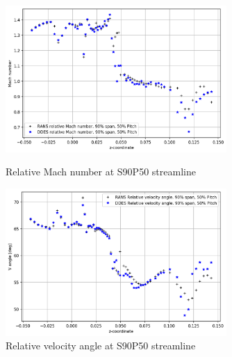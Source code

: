 \begin{figure}[ht]
  \centering
  \includegraphics[width=0.75\textwidth]{Pictures/mach-rel-S90-P50.png}
  \caption{Relative Mach number at S90P50 streamline} \label{mach-rel-S90-P50}
  \vspace*{\floatsep}%
  \includegraphics[width=0.75\textwidth]{Pictures/vang-rel-S90-P50.png}
  \caption{Relative velocity angle at S90P50 streamline} \label{vang-rel-S90-P50}
\end{figure}

